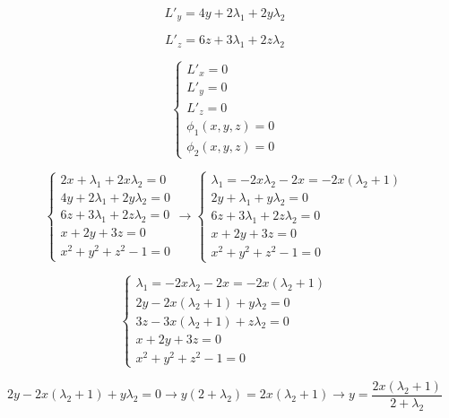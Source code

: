 \documentclass[a5paper, 10pt]{article}
\theoremstyle{definition}
\theoremstyle{plain}
\theoremstyle{remark}
\begin{document}
\begin{equation}
L'_y = 4y + 2\lambda_1  + 2y \lambda_2 
\end{equation}

\begin{equation}
L'_z =  6z +3 \lambda_1 + 2z \lambda_2 
\end{equation}

\begin{equation}
\begin{cases}
L'_x = 0\\
L'_y = 0\\
L'_z = 0\\
\phi_1 (x, y, z) = 0\\
\phi_2 (x, y, z) = 0
\end{cases}
\end{equation}

\begin{equation}
\begin{cases}
 2x+ \lambda_1  + 2x \lambda_2 = 0\\
4y + 2\lambda_1  + 2y \lambda_2  = 0\\
6z +3 \lambda_1 + 2z \lambda_2  = 0\\
 x + 2y+3z = 0\\
x^2 +y^2+z^2 - 1 = 0
\end{cases}
\to
\begin{cases}
 \lambda_1  = -2x \lambda_2 -2x = -2x(\lambda_2 + 1)\\
2y + \lambda_1  + y \lambda_2  = 0\\
6z +3 \lambda_1 + 2z \lambda_2  = 0\\
 x + 2y+3z = 0\\
x^2 +y^2+z^2 - 1 = 0
\end{cases}
\end{equation}

\begin{equation}
\begin{cases}
 \lambda_1  = -2x \lambda_2 -2x = -2x(\lambda_2 + 1)\\
2y -2x(\lambda_2 + 1)  + y \lambda_2  = 0\\
3z -3x(\lambda_2 + 1) + z \lambda_2  = 0\\
 x + 2y+3z = 0\\
x^2 +y^2+z^2 - 1 = 0
\end{cases}
\end{equation}

\begin{equation}
2y -2x(\lambda_2 + 1)  + y \lambda_2  =0 \to  y(2+\lambda_2) = 2x(\lambda_2 + 1) \to y = \frac{2x(\lambda_2 + 1)}{2+\lambda_2}
\end{equation}
\end{document}
